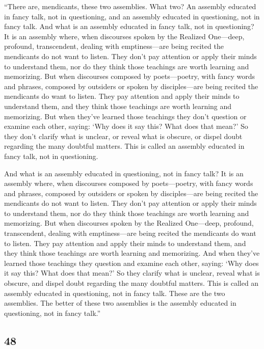 \documentclass[12pt,openany]{book}%
\begin{document}
“There are, mendicants, these two assemblies. What two? An assembly educated in fancy talk, not in questioning, and an assembly educated in questioning, not in fancy talk. And what is an assembly educated in fancy talk, not in questioning? It is an assembly where, when discourses spoken by the Realized One—deep, profound, transcendent, dealing with emptiness—are being recited the mendicants do not want to listen. They don’t pay attention or apply their minds to understand them, nor do they think those teachings are worth learning and memorizing. But when discourses composed by poets—poetry, with fancy words and phrases, composed by outsiders or spoken by disciples—are being recited the mendicants do want to listen. They pay attention and apply their minds to understand them, and they think those teachings are worth learning and memorizing. But when they’ve learned those teachings they don’t question or examine each other, saying: ‘Why does it say this? What does that mean?’ So they don’t clarify what is unclear, or reveal what is obscure, or dispel doubt regarding the many doubtful matters. This is called an assembly educated in fancy talk, not in questioning. 

And what is an assembly educated in questioning, not in fancy talk? It is an assembly where, when discourses composed by poets—poetry, with fancy words and phrases, composed by outsiders or spoken by disciples—are being recited the mendicants do not want to listen. They don’t pay attention or apply their minds to understand them, nor do they think those teachings are worth learning and memorizing. But when discourses spoken by the Realized One—deep, profound, transcendent, dealing with emptiness—are being recited the mendicants do want to listen. They pay attention and apply their minds to understand them, and they think those teachings are worth learning and memorizing. And when they’ve learned those teachings they question and examine each other, saying: ‘Why does it say this? What does that mean?’ So they clarify what is unclear, reveal what is obscure, and dispel doubt regarding the many doubtful matters. This is called an assembly educated in questioning, not in fancy talk. These are the two assemblies. The better of these two assemblies is the assembly educated in questioning, not in fancy talk.” 

\subsection*{48 }
\end{document}
